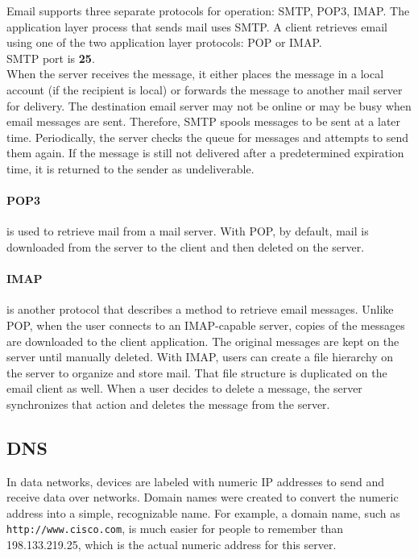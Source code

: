{Email supports three separate protocols for operation: SMTP, POP3, IMAP. The application layer process that sends mail uses SMTP. A client retrieves email using one of the two application layer protocols: POP or IMAP.\\

SMTP port is \textbf{25}. \\

When the server receives the message, it either places the message in a local account (if the recipient is local) or forwards the message to another mail server for delivery. The destination email server may not be online or may be busy when email messages are sent. Therefore, SMTP spools messages to be sent at a later time. Periodically, the server checks the queue for messages and attempts to send them again. If the message is still not delivered after a predetermined expiration time, it is returned to the sender as undeliverable. \\

\paragraph{POP3} is used to retrieve mail from a mail server. With POP, by default, mail is downloaded from the server to the client and then deleted on the server. 

\paragraph{IMAP} is another protocol that describes a method to retrieve email messages. Unlike POP, when the user connects to an IMAP-capable server, copies of the messages are downloaded to the client application.  The original messages are kept on the server until manually deleted. With IMAP, users can create a file hierarchy on the server to organize and store mail. That file structure is duplicated on the email client as well. When a user decides to delete a message, the server synchronizes that action and deletes the message from the server.

\subsection{DNS}

In data networks, devices are labeled with numeric IP addresses to send and receive data over networks. Domain names were created to convert the numeric address into a simple, recognizable name. For example, a domain name, such as \verb|http://www.cisco.com|, is much easier for people to remember than 198.133.219.25, which is the actual numeric address for this server. \\

}
